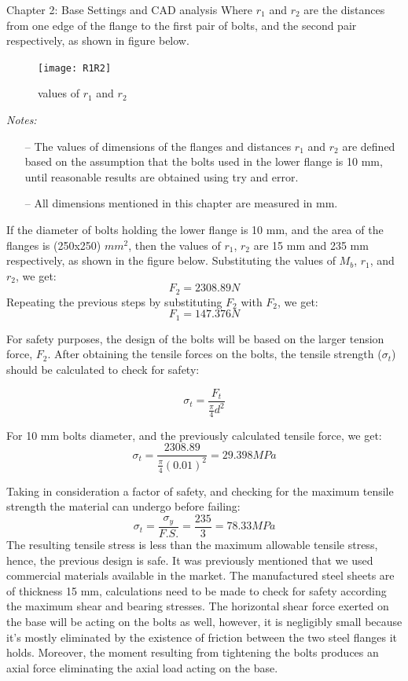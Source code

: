 \documentclass{book}
\begin{document}
\begin{chapter}{Chapter 2: Base Settings and CAD analysis}
Where $r_{1}$ and $r_{2}$ are the distances from one edge of the flange to the first pair of bolts, and the second pair respectively, as shown in figure below.
\begin{figure}[H]
\begin{center}
	\texttt{[image: R1R2]}
	\caption{values of $r_{1}$ and $r_{2}$}
\end{center}	
\end{figure}

\textit{Notes:} 
\begin{itemize}	
\item[--]  The values of dimensions of the flanges and distances $r_{1}$ and $r_{2}$ are defined based on the assumption that the bolts used in the lower flange is 10 mm, until reasonable results are obtained using try and error.
\item[--] All dimensions mentioned in this chapter are measured in mm.
\end{itemize}



If the diameter of bolts holding the lower flange is 10 mm, and the area of the flanges is (250x250) $mm^{2}$, then the values of $r_{1}$, $r_{2}$ are 15 mm and 235 mm respectively, as shown in the figure below.
\newline Substituting the values of $M_{b}$, $r_{1}$, and $r_{2}$, we get:
$$ F_{2} = 2308.89 N $$
Repeating the previous steps by substituting $F_{2}$ with $F_{2}$, we get:
$$ F_{1} = 147.376 N $$

For safety purposes, the design of the bolts will be based on the larger tension force, $F_{2}$.
After obtaining the tensile forces on the bolts, the tensile strength ($\sigma_{t}$) should be calculated to check for safety:

\begin{equation}
\sigma_{t} = \frac{F_{t}}{\frac{\pi}{4} d^{2}}
\end{equation}

For 10 mm bolts diameter, and the previously calculated tensile force, we get:
$$ \sigma_{t} = \frac{2308.89}{\frac{\pi}{4} (0.01)^{2}} = 29.398 MPa $$ 

Taking in consideration a factor of safety, and checking for the maximum tensile strength the material can undergo before failing:
$$\sigma_{t} = \frac{\sigma_{y}}{F.S.} = \frac{235}{3} = 78.33  MPa$$
The resulting tensile stress is less than the maximum allowable tensile stress, hence, the previous design is safe.
\newline It was previously mentioned that we used commercial materials available in the market. The manufactured steel sheets are of thickness 15 mm, calculations need to be made to check for safety according the maximum shear and bearing stresses.
\newline The horizontal shear force exerted on the base will be acting on the bolts as well, however, it is negligibly small because it’s mostly eliminated by the existence of friction between the two steel flanges it holds. Moreover, the moment resulting from tightening the bolts produces an axial force eliminating the axial load acting on the base.


\end{chapter}
\end{document}
